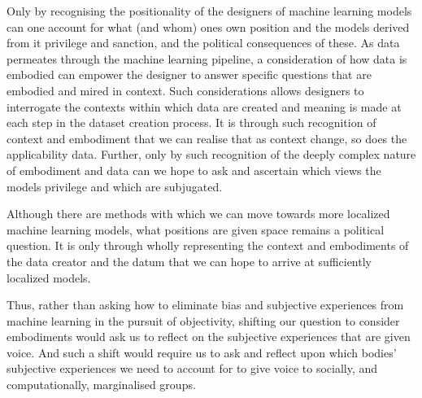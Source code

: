 Only by recognising the positionality of the designers of machine learning models can one account for what (and whom) ones own position and the models derived from it privilege and sanction, and the political consequences of these. As data permeates through the machine learning pipeline, a consideration of how data is embodied can empower the designer to answer specific questions that are embodied and mired in context. Such considerations allows designers to interrogate the contexts within which data are created and meaning is made at each step in the dataset creation process. It is through such recognition of context and embodiment that we can realise that as context change, so does the applicability data. Further, only by such recognition of the deeply complex nature of embodiment and data can we hope to ask and ascertain which views the models privilege and which are subjugated.

Although there are methods with which we can move towards more localized machine learning models, what positions are given space remains a political question. It is only through wholly representing the context and embodiments of the data creator and the datum that we can hope to arrive at sufficiently localized models.

Thus, rather than asking how to eliminate bias and subjective experiences from machine learning in the pursuit of objectivity, shifting our question to consider embodiments would ask us to reflect on the subjective experiences that are given voice. And such a shift would require us to ask and reflect upon which bodies' subjective experiences we need to account for to give voice to socially, and computationally, marginalised groups.

%
%
